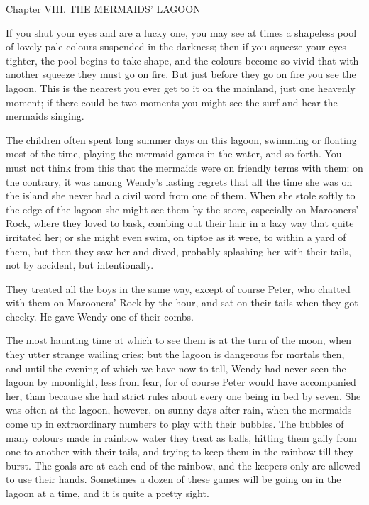 Chapter VIII.
THE MERMAIDS' LAGOON


If you shut your eyes and are a lucky one, you may see at times a
shapeless pool of lovely pale colours suspended in the darkness; then
if you squeeze your eyes tighter, the pool begins to take shape, and
the colours become so vivid that with another squeeze they must go on
fire. But just before they go on fire you see the lagoon. This is the
nearest you ever get to it on the mainland, just one heavenly moment;
if there could be two moments you might see the surf and hear the
mermaids singing.

The children often spent long summer days on this lagoon, swimming or
floating most of the time, playing the mermaid games in the water, and
so forth. You must not think from this that the mermaids were on
friendly terms with them: on the contrary, it was among Wendy's lasting
regrets that all the time she was on the island she never had a civil
word from one of them. When she stole softly to the edge of the lagoon
she might see them by the score, especially on Marooners' Rock, where
they loved to bask, combing out their hair in a lazy way that quite
irritated her; or she might even swim, on tiptoe as it were, to within
a yard of them, but then they saw her and dived, probably splashing her
with their tails, not by accident, but intentionally.

They treated all the boys in the same way, except of course Peter, who
chatted with them on Marooners' Rock by the hour, and sat on their
tails when they got cheeky. He gave Wendy one of their combs.

The most haunting time at which to see them is at the turn of the moon,
when they utter strange wailing cries; but the lagoon is dangerous for
mortals then, and until the evening of which we have now to tell, Wendy
had never seen the lagoon by moonlight, less from fear, for of course
Peter would have accompanied her, than because she had strict rules
about every one being in bed by seven. She was often at the lagoon,
however, on sunny days after rain, when the mermaids come up in
extraordinary numbers to play with their bubbles. The bubbles of many
colours made in rainbow water they treat as balls, hitting them gaily
from one to another with their tails, and trying to keep them in the
rainbow till they burst. The goals are at each end of the rainbow, and
the keepers only are allowed to use their hands. Sometimes a dozen of
these games will be going on in the lagoon at a time, and it is quite a
pretty sight.

